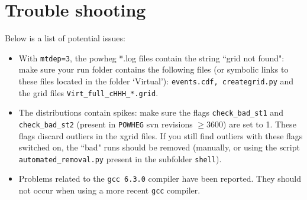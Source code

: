 \documentclass[paper]{JHEP3}
\newcommand\POWHEG{{\tt POWHEG}}
\begin{document}
\section{Trouble shooting}

Below is a list of potential issues:

\begin{itemize}
\item With {\tt mtdep=3}, the powheg *.log files contain the string ``grid not found": make sure your run folder contains the following files 
(or symbolic links to these files located in the folder `Virtual'): {\tt events.cdf, creategrid.py} and the grid files  {\tt Virt\_full\_cHHH\_*.grid}.
\item The distributions contain spikes: make sure the flags {\tt check\_bad\_st1} and {\tt check\_bad\_st2} (present in \POWHEG{} svn revisions $\geq 3600$) are set to 1. These flags discard outliers in the xgrid files. If you still find outliers with these flags switched on, the ``bad" runs should be removed 
(manually, or using the script {\tt automated\_removal.py} present in the subfolder {\tt shell}).
\item Problems related to the {\tt gcc 6.3.0} compiler have been reported. They should not occur when using a more recent {\tt gcc} compiler.
\end{itemize}
\end{document}
